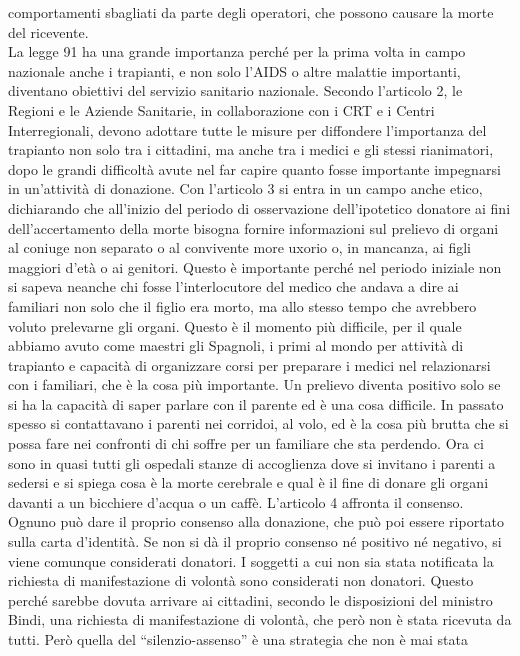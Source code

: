 comportamenti sbagliati da parte degli operatori, che possono causare la
morte del ricevente.
\\
La legge 91 ha una grande importanza perché per la prima volta in campo
nazionale anche i trapianti, e non solo l'AIDS o altre malattie
importanti, diventano obiettivi del servizio sanitario nazionale.
Secondo l'articolo 2, le Regioni e le Aziende Sanitarie, in
collaborazione con i CRT e i Centri Interregionali, devono adottare
tutte le misure per diffondere l'importanza del trapianto non solo tra i
cittadini, ma anche tra i medici e gli stessi rianimatori, dopo le
grandi difficoltà avute nel far capire quanto fosse importante
impegnarsi in un'attività di donazione. Con l'articolo 3 si entra in un
campo anche etico, dichiarando che all'inizio del periodo di
osservazione dell'ipotetico donatore ai fini dell'accertamento della
morte bisogna fornire informazioni sul prelievo di organi al coniuge non
separato o al convivente more uxorio o, in mancanza, ai figli maggiori
d'età o ai genitori. Questo è importante perché nel periodo iniziale non
si sapeva neanche chi fosse l'interlocutore del medico che andava a dire
ai familiari non solo che il figlio era morto, ma allo stesso tempo che
avrebbero voluto prelevarne gli organi. Questo è il momento più
difficile, per il quale abbiamo avuto come maestri gli Spagnoli, i primi
al mondo per attività di trapianto e capacità di organizzare corsi per
preparare i medici nel relazionarsi con i familiari, che è la cosa più
importante. Un prelievo diventa positivo solo se si ha la capacità di
saper parlare con il parente ed è una cosa difficile. In passato spesso
si contattavano i parenti nei corridoi, al volo, ed è la cosa più brutta
che si possa fare nei confronti di chi soffre per un familiare che sta
perdendo. Ora ci sono in quasi tutti gli ospedali stanze di accoglienza
dove si invitano i parenti a sedersi e si spiega cosa è la morte
cerebrale e qual è il fine di donare gli organi davanti a un bicchiere
d'acqua o un caffè. L'articolo 4 affronta il consenso. Ognuno può dare
il proprio consenso alla donazione, che può poi essere riportato sulla
carta d'identità. Se non si dà il proprio consenso né positivo né
negativo, si viene comunque considerati donatori. I soggetti a cui non
sia stata notificata la richiesta di manifestazione di volontà sono
considerati non donatori. Questo perché sarebbe dovuta arrivare ai
cittadini, secondo le disposizioni del ministro Bindi, una richiesta di
manifestazione di volontà, che però non è stata ricevuta da tutti. Però
quella del ``silenzio-assenso'' è una strategia che non è mai stata
